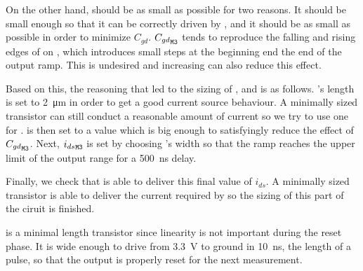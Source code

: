 On the other hand,  should be as small as possible for two reasons.
It should be small enough so that it can be correctly driven by , and it should be as small as possible in order to minimize $C_{gd}$.
${C_{gd}}_{\mathtt{M3}}$ tends to reproduce the falling and rising edges of  on , which introduces small steps at the beginning end the end of the output ramp.
This is undesired and increasing  can also reduce this effect.

Based on this, the reasoning that led to the sizing of ,  and  is as follows.
's length is set to \SI{2}{\micro\meter} in order to get a good current source behaviour.
A minimally sized transistor can still conduct a reasonable amount of current so we try to use one for .
 is then set to a value which is big enough to satisfyingly reduce the effect of ${C_{gd}}_{\mathtt{M3}}$.
Next, ${i_{ds}}_{\mathtt{M3}}$ is set by choosing 's width so that the ramp reaches the upper limit of the output range for a \SI{500}{\nano\second} delay.

Finally, we check that  is able to deliver this final value of $i_{ds}$.
A minimally sized transistor is able to deliver the current required by  so the sizing of this part of the ciruit is finished.

 is a minimal length transistor since linearity is not important during the reset phase.
It is wide enough to drive  from \SI{3.3}{\volt} to ground in \SI{10}{\nano\second}, the length of a pulse, so that the output is properly reset for the next measurement.
